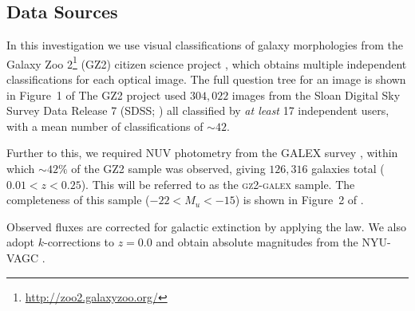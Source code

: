 \documentclass[useAMS,usenatbib]{mn2e}
\begin{document}
\subsection{Data Sources}\label{sec:photo}

\begin{figure}
\label{fig:sfrmass}
\end{figure}

In this investigation we use visual classifications of galaxy morphologies from the Galaxy Zoo 2\footnote{\url{http://zoo2.galaxyzoo.org/}} (GZ2) citizen science project \citep{GZ2}, which obtains multiple independent classifications for each optical image. The full question tree for an image is shown in Figure~1 of \citeauthor{GZ2}  The GZ2 project used $304, 022$ images from the Sloan Digital Sky Survey Data Release 7 (SDSS; \citealt{york00, abazajian09}) all classified by \emph{at least} 17 independent users, with a mean number of classifications of $\sim42$.

Further to this, we required NUV photometry from the GALEX survey \citep{martin05}, within which $\sim42\%$ of the GZ2 sample was observed, giving $126, 316$ galaxies total ($0.01 < z < 0.25$). This will be referred to as the \textsc{gz2-galex} sample. The completeness of this sample ($-22 < M_u < -15$) is shown in Figure~2 of \cite{smethurst15}. 

Observed fluxes are corrected for galactic extinction \citep{Oh11} by applying the \citet{cardelli89} law. We also adopt $k$-corrections to $z = 0.0$ and obtain absolute magnitudes from the NYU-VAGC \citep{blanton05, blanton07, padmanabhan08}.
\end{document}
